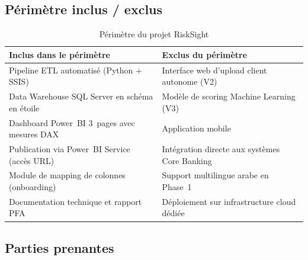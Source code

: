 \documentclass[12pt, a4paper]{report}
\begin{document}
\subsection{Périmètre inclus / exclus}

\begin{table}[H]
\centering
\caption{Périmètre du projet RiskSight}
\label{tab:perimetre}
\renewcommand{\arraystretch}{1.4}
\begin{tabularx}{\textwidth}{X X}
\toprule
\rowcolor{successcolor!15}
\textbf{\textcolor{successcolor}{Inclus dans le périmètre}} & \textbf{\textcolor{dangercolor}{Exclus du périmètre}} \\
\midrule
Pipeline ETL automatisé (Python + SSIS) & Interface web d'upload client autonome (V2) \\
Data Warehouse SQL Server en schéma en étoile & Modèle de scoring Machine Learning (V3) \\
Dashboard Power~BI 3~pages avec \newline mesures DAX & Application mobile \\
Publication via Power~BI Service (accès URL) & Intégration directe aux systèmes Core Banking \\
Module de mapping de colonnes \newline (onboarding) & Support multilingue arabe en Phase~1 \\
Documentation technique et rapport PFA & Déploiement sur infrastructure cloud \newline dédiée \\
\bottomrule
\end{tabularx}
\end{table}

\subsection{Parties prenantes}
\end{document}
